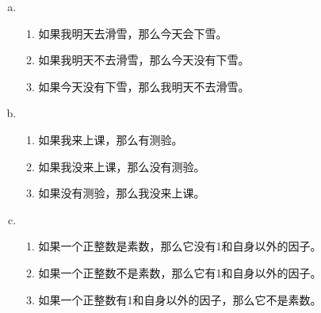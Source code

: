 {{        %
        \begin{practices}
            \begin{enumerate}[a)]
                \item
                {
                    \begin{enumerate}[1.]
                        \item 如果我明天去滑雪，那么今天会下雪。
                        \item 如果我明天不去滑雪，那么今天没有下雪。
                        \item 如果今天没有下雪，那么我明天不去滑雪。
                    \end{enumerate}
                }
                \item
                {
                    \begin{enumerate}[1.]
                        \item 如果我来上课，那么有测验。
                        \item 如果我没来上课，那么没有测验。
                        \item 如果没有测验，那么我没来上课。
                    \end{enumerate}
                }
                \item
                {
                    \begin{enumerate}[1.]
                        \item 如果一个正整数是素数，那么它没有1和自身以外的因子。
                        \item 如果一个正整数不是素数，那么它有1和自身以外的因子。
                        \item 如果一个正整数有1和自身以外的因子，那么它不是素数。
                    \end{enumerate}
                }
            \end{enumerate}
        \end{practices}

}}
